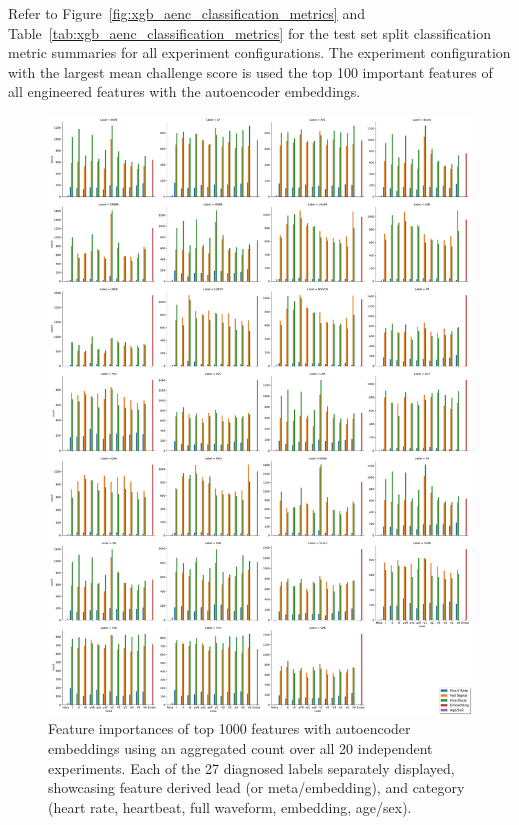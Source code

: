 \documentclass[\main/thesis.tex]{subfiles}
\begin{document}
Refer to Figure~\ref{fig:xgb_aenc_classification_metrics} and Table~\ref{tab:xgb_aenc_classification_metrics} for the test set split classification metric summaries for all experiment configurations.
The experiment configuration with the largest mean challenge score is used the top 100 important features of all engineered features with the autoencoder embeddings.

\begin{figure}[t]
    \centering
    \includegraphics[width=\textwidth]{figure/top_1000_feature_importances_all_w_embedding.pdf}
    \caption{Feature importances of top 1000 features with autoencoder embeddings using an aggregated count over all 20 independent experiments. Each of the 27 diagnosed labels separately displayed, showcasing feature derived lead (or meta/embedding), and category (heart rate, heartbeat, full waveform, embedding, age/sex).}
    \label{fig:xgb_aenc_top_1000_features_labelwise}
\end{figure}
\end{document}
